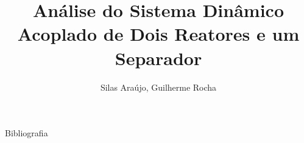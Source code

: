 \documentclass[aspectratio=169]{beamer}
\title{Análise do Sistema Dinâmico Acoplado de Dois Reatores e um Separador}
\author[Silas A., Guilherme R.]{Silas Araújo, Guilherme Rocha}
\institute{Escola Politécnica da Universidade Federal da Bahia}
\begin{document}
\maketitle





\begin{frame}[allowframebreaks]{Bibliografia}
  
\end{frame}
\end{document}
